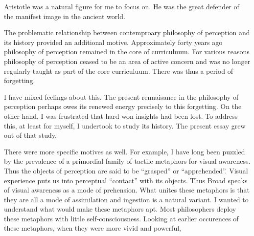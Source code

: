 Aristotle was a natural figure for me to focus on. He was the great defender of the manifest image in the ancient world. 

The problematic relationship between contemproary philosophy of perception and its history provided an additional motive. Approximately forty years ago philosophy of perception remained in the core of curriculuum. For various reasons philosophy of perception ceased to be an area of active concern and was no longer regularly taught as part of the core curriculuum. There was thus a period of forgetting. 

I have mixed feelings about this. The present rennaisance in the philosophy of perception perhaps owes its renewed energy precisely to this forgetting. On the other hand, I was frustrated that hard won insights had been lost. To address this, at least for myself, I undertook to study its history. The present essay grew out of that study.

There were more specific motives as well. For example, I have long been puzzled by the prevalence of a primordial family of tactile metaphors for visual awareness. Thus the objects of perception are said to be ``grasped'' or ``apprehended''. Visual experience puts us into perceptual ``contact'' with its objects. Thus Broad speaks of visual awareness as a mode of prehension. What unites these metaphors is that they are all a mode of assimilation and ingestion is a natural variant. I wanted to understand what would make these metaphors apt. Most philosophers deploy these metaphors with little self-consciousness. Looking at earlier occurences of these metaphors, when they were more vivid and powerful, 


